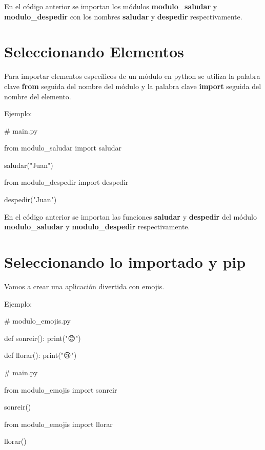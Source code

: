 \documentclass[
  a4paper,
  DIV=11,
  numbers=noendperiod,
  onepage,
  openany]{scrreprt}
\newenvironment{Shaded}{\begin{snugshade}}{\end{snugshade}}
\newcommand{\BuiltInTok}[1]{\textcolor[rgb]{0.00,0.23,0.31}{#1}}
\newcommand{\CommentTok}[1]{\textcolor[rgb]{0.37,0.37,0.37}{#1}}
\newcommand{\ImportTok}[1]{\textcolor[rgb]{0.00,0.46,0.62}{#1}}
\newcommand{\KeywordTok}[1]{\textcolor[rgb]{0.00,0.23,0.31}{#1}}
\newcommand{\NormalTok}[1]{\textcolor[rgb]{0.00,0.23,0.31}{#1}}
\newcommand{\StringTok}[1]{\textcolor[rgb]{0.13,0.47,0.30}{#1}}
\begin{document}
En el código anterior se importan los módulos \textbf{modulo\_saludar} y
\textbf{modulo\_despedir} con los nombres \textbf{saludar} y
\textbf{despedir} respectivamente.

\section{Seleccionando Elementos}\label{seleccionando-elementos}

Para importar elementos específicos de un módulo en python se utiliza la
palabra clave \textbf{from} seguida del nombre del módulo y la palabra
clave \textbf{import} seguida del nombre del elemento.

Ejemplo:

\begin{Shaded}
\begin{Highlighting}[]
\CommentTok{\# main.py}

\ImportTok{from}\NormalTok{ modulo\_saludar }\ImportTok{import}\NormalTok{ saludar}

\NormalTok{saludar(}\StringTok{"Juan"}\NormalTok{)}

\ImportTok{from}\NormalTok{ modulo\_despedir }\ImportTok{import}\NormalTok{ despedir}

\NormalTok{despedir(}\StringTok{"Juan"}\NormalTok{)}
\end{Highlighting}
\end{Shaded}

En el código anterior se importan las funciones \textbf{saludar} y
\textbf{despedir} del módulo \textbf{modulo\_saludar} y
\textbf{modulo\_despedir} respectivamente.

\section{Seleccionando lo importado y
pip}\label{seleccionando-lo-importado-y-pip}

Vamos a crear una aplicación divertida con emojis.

Ejemplo:

\begin{Shaded}
\begin{Highlighting}[]
\CommentTok{\# modulo\_emojis.py}

\KeywordTok{def}\NormalTok{ sonreir():}
    \BuiltInTok{print}\NormalTok{(}\StringTok{"😊"}\NormalTok{)}

\KeywordTok{def}\NormalTok{ llorar():}
    \BuiltInTok{print}\NormalTok{(}\StringTok{"😢"}\NormalTok{)}

\CommentTok{\# main.py}

\ImportTok{from}\NormalTok{ modulo\_emojis }\ImportTok{import}\NormalTok{ sonreir}

\NormalTok{sonreir()}

\ImportTok{from}\NormalTok{ modulo\_emojis }\ImportTok{import}\NormalTok{ llorar}

\NormalTok{llorar()}
\end{Highlighting}
\end{Shaded}
\end{document}
